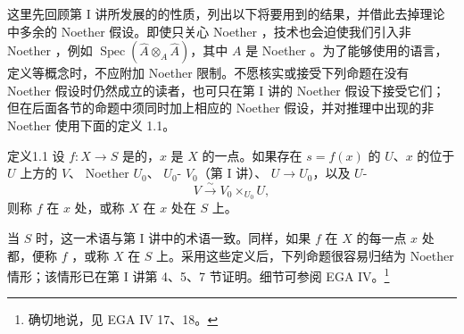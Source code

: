 这里先回顾第 I 讲所发展的的性质，列出以下将要用到的结果，并借此去掉理论中多余的 Noether 假设。即使只关心 Noether ，技术也会迫使我们引入非 Noether ，例如 $\operatorname{Spec}(\widehat A\otimes_A\widehat A)$，其中 $A$ 是 Noether 。为了能够使用的语言，定义等概念时，不应附加 Noether 限制。不愿核实或接受下列命题在没有 Noether 假设时仍然成立的读者，也可只在第 I 讲的 Noether 假设下接受它们；但在后面各节的命题中须同时加上相应的 Noether 假设，并对推理中出现的非 Noether 使用下面的定义 1.1。

\begin{SGAresult}{定义}{1.1}
设 $f:X\to S$ 是的，$x$ 是 $X$ 的一点。如果存在 $s=f(x)$ 的 $U$、$x$ 的位于 $U$ 上方的 $V$、 Noether  $U_0$、 $U_0$- $V_0$（第 I 讲）、 $U\to U_0$，以及 $U$-
\[
V\xrightarrow{\sim}V_0\times_{U_0}U,
\]
则称 $f$ 在 $x$ 处，或称 $X$ 在 $x$ 处在 $S$ 上。
\end{SGAresult}
当 $S$  时，这一术语与第 I 讲中的术语一致。同样，如果 $f$ 在 $X$ 的每一点 $x$ 处都，便称 $f$ ，或称 $X$ 在 $S$ 上。采用这些定义后，下列命题很容易归结为 Noether 情形；该情形已在第 I 讲第 4、5、7 节证明。细节可参阅 EGA IV。\footnote{确切地说，见 EGA IV 17、18。}

